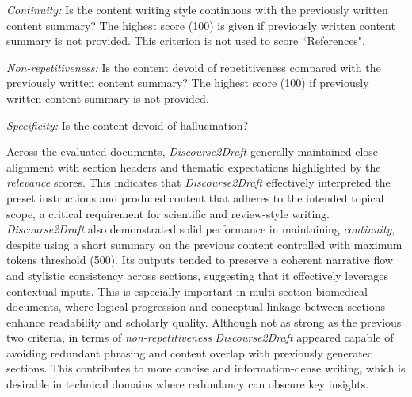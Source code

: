 \documentclass[utf8]{FrontiersinHarvard} %
\newcommand{\appname}{\emph{Discourse2Draft}}
\newcommand{\maxTokensSummarization}{500}
\begin{document}
\textit{Continuity:} Is the content writing style continuous with the previously written content summary? The highest score (100) is given if previously written content summary is not provided. This criterion is not used to score ``References".

\textit{Non-repetitiveness:} Is the content devoid of repetitiveness compared with the previously written content summary? The highest score (100) if previously written content summary is not provided.

\textit{Specificity:} Is the content devoid of hallucination? 

Across the evaluated documents, \appname{} generally maintained close alignment with section headers and thematic expectations highlighted by the \textit{relevance} scores. This indicates that \appname{} effectively interpreted the preset instructions and produced content that adheres to the intended topical scope, a critical requirement for scientific and review-style writing. \appname{} also demonstrated solid performance in maintaining \textit{continuity}, despite using a short summary on the previous content controlled with maximum tokens threshold (\maxTokensSummarization). Its outputs tended to preserve a coherent narrative flow and stylistic consistency across sections, suggesting that it effectively leverages contextual inputs. This is especially important in multi-section biomedical documents, where logical progression and conceptual linkage between sections enhance readability and scholarly quality. Although not as strong as the previous two criteria, in terms of \textit{non-repetitiveness} \appname{} appeared capable of avoiding redundant phrasing and content overlap with previously generated sections. This contributes to more concise and information-dense writing, which is desirable in technical domains where redundancy can obscure key insights.
\end{document}
